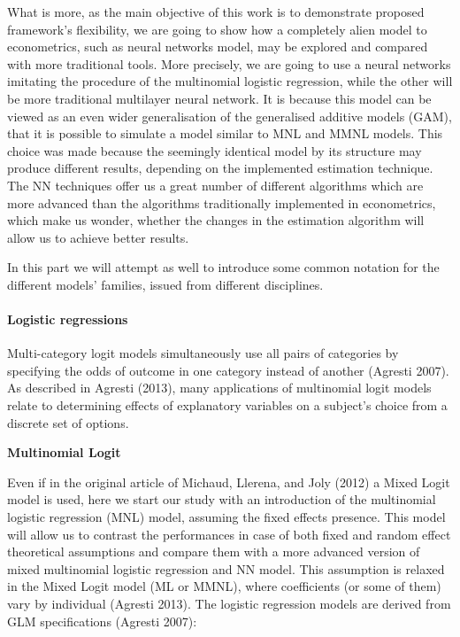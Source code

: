 \documentclass[12pt,]{article}
\let\oldparagraph\paragraph
\renewcommand{\paragraph}[1]{\oldparagraph{#1}\mbox{}}
\begin{document}
What is more, as the main objective of this work is to demonstrate
proposed framework's flexibility, we are going to show how a completely
alien model to econometrics, such as neural networks model, may be
explored and compared with more traditional tools. More precisely, we
are going to use a neural networks imitating the procedure of the
multinomial logistic regression, while the other will be more
traditional multilayer neural network. It is because this model can be
viewed as an even wider generalisation of the generalised additive
models (GAM), that it is possible to simulate a model similar to MNL and
MMNL models. This choice was made because the seemingly identical model
by its structure may produce different results, depending on the
implemented estimation technique. The NN techniques offer us a great
number of different algorithms which are more advanced than the
algorithms traditionally implemented in econometrics, which make us
wonder, whether the changes in the estimation algorithm will allow us to
achieve better results.

In this part we will attempt as well to introduce some common notation
for the different models' families, issued from different disciplines.

\hypertarget{logistic-regressions}{%
\paragraph{Logistic regressions}\label{logistic-regressions}}

Multi-category logit models simultaneously use all pairs of categories
by specifying the odds of outcome in one category instead of another
(Agresti 2007). As described in Agresti (2013), many applications of
multinomial logit models relate to determining effects of explanatory
variables on a subject's choice from a discrete set of options.

\textbf{Multinomial Logit}

Even if in the original article of Michaud, Llerena, and Joly (2012) a
Mixed Logit model is used, here we start our study with an introduction
of the multinomial logistic regression (MNL) model, assuming the fixed
effects presence. This model will allow us to contrast the performances
in case of both fixed and random effect theoretical assumptions and
compare them with a more advanced version of mixed multinomial logistic
regression and NN model. This assumption is relaxed in the Mixed Logit
model (ML or MMNL), where coefficients (or some of them) vary by
individual (Agresti 2013). The logistic regression models are derived
from GLM specifications (Agresti 2007):
\end{document}
